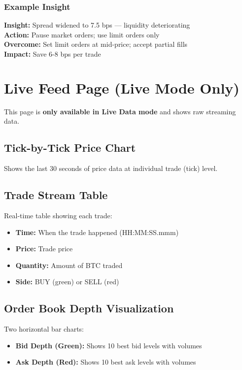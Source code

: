 \documentclass[12pt,a4paper]{article}
\begin{document}
\subsubsection{Example Insight}
\begin{tcolorbox}[colback=red!10, colframe=red!50, title=🔴 HIGH Priority]
\textbf{Insight:} Spread widened to 7.5 bps — liquidity deteriorating\\
\textbf{Action:} Pause market orders; use limit orders only\\
\textbf{Overcome:} Set limit orders at mid-price; accept partial fills\\
\textbf{Impact:} Save 6-8 bps per trade
\end{tcolorbox}

\section{Live Feed Page (Live Mode Only)}

This page is \textbf{only available in Live Data mode} and shows raw streaming data.

\subsection{Tick-by-Tick Price Chart}
Shows the last 30 seconds of price data at individual trade (tick) level.

\subsection{Trade Stream Table}
Real-time table showing each trade:
\begin{itemize}
    \item \textbf{Time:} When the trade happened (HH:MM:SS.mmm)
    \item \textbf{Price:} Trade price
    \item \textbf{Quantity:} Amount of BTC traded
    \item \textbf{Side:} BUY (green) or SELL (red)
\end{itemize}

\subsection{Order Book Depth Visualization}
Two horizontal bar charts:
\begin{itemize}
    \item \textbf{Bid Depth (Green):} Shows 10 best bid levels with volumes
    \item \textbf{Ask Depth (Red):} Shows 10 best ask levels with volumes
\end{itemize}
\end{document}
